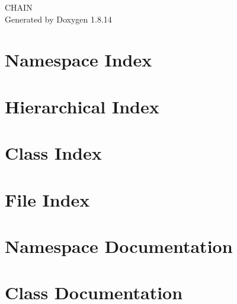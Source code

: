 \documentclass[twoside]{book}
\newcommand{\+}{\discretionary{\mbox{\scriptsize$\hookleftarrow$}}{}{}}
\newcommand{\clearemptydoublepage}{%
  \newpage{\pagestyle{empty}\cleardoublepage}%
}
\begin{document}
\hypersetup{pageanchor=false,
             bookmarksnumbered=true,
             pdfencoding=unicode
            }
\begin{titlepage}
\vspace*{7cm}
\begin{center}%
{\Large C\+H\+A\+IN }\\
\vspace*{1cm}
{\large Generated by Doxygen 1.8.14}\\
\end{center}
\end{titlepage}
\clearemptydoublepage
{}
\tableofcontents
\clearemptydoublepage
{}
\hypersetup{pageanchor=true}

\chapter{Namespace Index}

\chapter{Hierarchical Index}

\chapter{Class Index}

\chapter{File Index}

\chapter{Namespace Documentation}

\chapter{Class Documentation}























\end{document}
